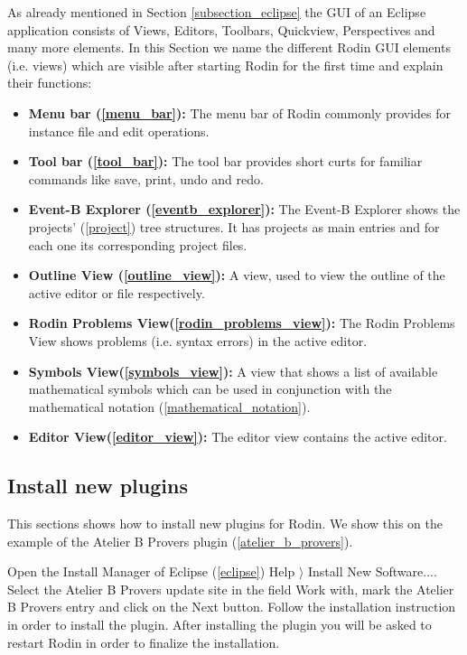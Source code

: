 As already mentioned in Section \ref{subsection_eclipse} the GUI of an Eclipse application consists of Views, Editors, Toolbars, Quickview, Perspectives and many more elements. In this Section we name the different Rodin GUI elements (i.e. views) which are visible after starting Rodin for the first time and explain their functions:

\begin{itemize}
	\item \textbf{Menu bar (\ref{menu_bar}):} The menu bar of Rodin commonly provides for instance file and edit operations.
	\item \textbf{Tool bar (\ref{tool_bar}):} The tool bar provides short curts for familiar commands like save, print, undo and redo.
	\item \textbf{Event-B Explorer (\ref{eventb_explorer}):} The Event-B Explorer shows the projects' (\ref{project}) tree structures. It has projects as main entries and for each one its corresponding project files.
	\item \textbf{Outline View (\ref{outline_view}):} A view, used to view the outline of the active editor or file respectively.
	\item \textbf{Rodin Problems View(\ref{rodin_problems_view}):} The Rodin Problems View shows problems (i.e. syntax errors) in the active editor.
	\item \textbf{Symbols View(\ref{symbols_view}):} A view that shows a list of available mathematical symbols which can be used in conjunction with the mathematical notation (\ref{mathematical_notation}).
	\item \textbf{Editor View(\ref{editor_view}):} The editor view contains the active editor.
\end{itemize}

\subsection{Install new plugins}

This sections shows how to install new plugins for Rodin. We show this on the example of the Atelier B Provers plugin (\ref{atelier_b_provers}). 

Open the Install Manager of Eclipse (\ref{eclipse}) \textsf{Help $\rangle$ Install New Software...}. Select the Atelier B Provers update site in the field \textsf{Work with}, mark the Atelier B Provers entry and click on the \textsf{Next} button. Follow the installation instruction in order to install the plugin. After installing the plugin you will be asked to restart Rodin in order to finalize the installation.

